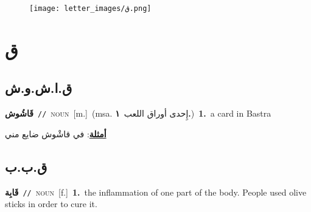 \documentclass[10pt,a4paper,twoside]{article} %
\begin{document}
\begin{figure*}[t!]\centering\texttt{[image: letter\_images/ق.png]}\end{figure*}
\color{white}

 \section*{\foreignlanguage{arabic}{ق}} 
 \begin{multicols}{2} 

%
\color{black}
\vspace{-3mm}
\subsection*{\color{blue}\foreignlanguage{arabic}{ق.ا.ش.و.ش}\color{blue}{ (ntws)}} 

{\setlength\topsep{0pt}\textbf{\foreignlanguage{arabic}{قَاشُوش}}\ {\color{gray}\texttt{//}\color{black}}\ \textsc{noun}\ [m.]\ \color{gray}(msa. \foreignlanguage{arabic}{إِحدى أوراق اللعب}~\foreignlanguage{arabic}{\textbf{١.}})\color{black}\ \textbf{1.}~a card in Bastra\  \begin{flushright}\color{gray}\foreignlanguage{arabic}{\textbf{\underline{\foreignlanguage{arabic}{أمثلة}}}: في قاشْوش ضايع مني}\end{flushright}\color{black}} \vspace{2mm}

\vspace{-3mm}
\subsection*{\color{blue}\foreignlanguage{arabic}{ق.ب.ب}\color{blue}{}} 

{\setlength\topsep{0pt}\textbf{\foreignlanguage{arabic}{قَابِة}}\ {\color{gray}\texttt{//}\color{black}}\ \textsc{noun}\ [f.]\ \textbf{1.}~the inflammation of one part of the body. People used olive sticks in order to cure it.\ } \vspace{2mm}


\end{multicols}
\end{document}
